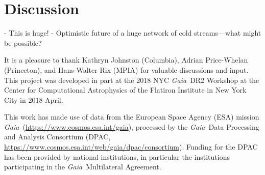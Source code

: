\documentclass[12pt, modern]{aastex62}
\newcommand{\acronym}[1]{{\small{#1}}}
\newcommand{\Gaia}{\textsl{Gaia}}
\begin{document}
\section{Discussion}
- This is huge!
- Optimistic future of a huge network of cold streams---what might be possible?

\acknowledgements
It is a pleasure to thank
  Kathryn Johnston (Columbia),
  Adrian Price-Whelan (Princeton),
  and
  Hans-Walter Rix (\acronym{MPIA})
for valuable discussions and input.
This project was developed in part at the
2018 \acronym{NYC} \Gaia\ \acronym{DR2} Workshop
at the Center for Computational Astrophysics of the Flatiron Institute
in New York City in 2018 April.

This work has made use of data from the European Space Agency (\acronym{ESA}) mission
\Gaia\ (\url{https://www.cosmos.esa.int/gaia}), processed by the \Gaia\ Data
Processing and Analysis Consortium (\acronym{DPAC},
\url{https://www.cosmos.esa.int/web/gaia/dpac/consortium}). Funding for the
\acronym{DPAC}
has been provided by national institutions, in particular the institutions
participating in the \Gaia\ Multilateral Agreement.



\end{document}
